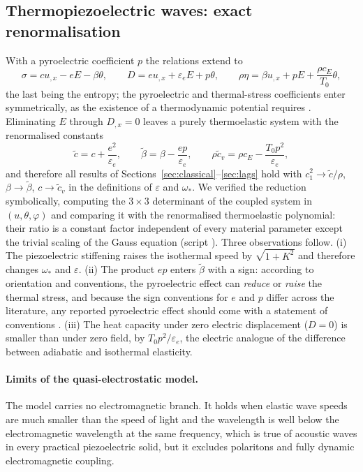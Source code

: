 \subsection{Thermopiezoelectric waves: exact renormalisation}
With a pyroelectric coefficient $p$ the relations extend to
\begin{equation}
\sigma=cu_{,x}-eE-\beta\theta,\qquad D=eu_{,x}+\varepsilon_eE+p\theta,\qquad \rho\eta=\beta u_{,x}+pE+\frac{\rho c_E}{T_0}\theta,
\end{equation}
the last being the entropy; the pyroelectric and thermal-stress coefficients enter symmetrically, as the existence of a thermodynamic potential requires \citep{Mindlin1974Thermopiezo,Nowacki1978,Chandrasekharaiah1984}. Eliminating $E$ through $D_{,x}=0$ leaves a purely thermoelastic system with the renormalised constants
\begin{equation}
\tilde c=c+\frac{e^2}{\varepsilon_e},\qquad
\tilde\beta=\beta-\frac{ep}{\varepsilon_e},\qquad
\rho\tilde c_v=\rho c_E-\frac{T_0p^2}{\varepsilon_e},\label{eq:renorm}
\end{equation}
and therefore all results of Sections~\ref{sec:classical}--\ref{sec:lags} hold with $c_1^2\to\tilde c/\rho$, $\beta\to\tilde\beta$, $c\to\tilde c_v$ in the definitions of $\varepsilon$ and $\omega_*$. We verified the reduction symbolically, computing the $3\times3$ determinant of the coupled system in $(u,\theta,\varphi)$ and comparing it with the renormalised thermoelastic polynomial: their ratio is a constant factor independent of every material parameter except the trivial scaling of the Gauss equation (script ). Three observations follow. (i) The piezoelectric stiffening raises the isothermal speed by $\sqrt{1+K^2}$ and therefore changes $\omega_*$ and $\varepsilon$. (ii) The product $ep$ enters $\tilde\beta$ with a sign: according to orientation and conventions, the pyroelectric effect can \emph{reduce} or \emph{raise} the thermal stress, and because the sign conventions for $e$ and $p$ differ across the literature, any reported pyroelectric effect should come with a statement of conventions \citep{Yang2018}. (iii) The heat capacity under zero electric displacement ($D=0$) is smaller than under zero field, by $T_0p^2/\varepsilon_e$, the electric analogue of the difference between adiabatic and isothermal elasticity.

\paragraph{Limits of the quasi-electrostatic model.} The model carries no electromagnetic branch. It holds when elastic wave speeds are much smaller than the speed of light and the wavelength is well below the electromagnetic wavelength at the same frequency, which is true of acoustic waves in every practical piezoelectric solid, but it excludes polaritons and fully dynamic electromagnetic coupling.

